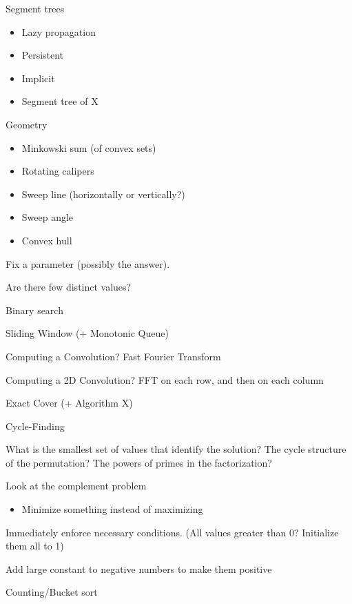 \begin{myitemize}
      \item Segment trees
        \begin{itemize}
          \item Lazy propagation
          \item Persistent
          \item Implicit
          \item Segment tree of X
        \end{itemize}
      \item Geometry
        \begin{itemize}
          \item Minkowski sum (of convex sets)
          \item Rotating calipers
          \item Sweep line (horizontally or vertically?)
          \item Sweep angle
          \item Convex hull
        \end{itemize}
      \item Fix a parameter (possibly the answer).
      \item Are there few distinct values?
      \item Binary search
      \item Sliding Window (+ Monotonic Queue)
      \item Computing a Convolution? Fast Fourier Transform
      \item Computing a 2D Convolution? FFT on each row, and then on each column
      \item Exact Cover (+ Algorithm X)
      \item Cycle-Finding
      \item What is the smallest set of values that identify the solution? The cycle structure of the permutation? The powers of primes in the factorization?
      \item Look at the complement problem
        \begin{itemize}
          \item Minimize something instead of maximizing
        \end{itemize}
      \item Immediately enforce necessary conditions. (All values greater than 0? Initialize them all to 1)
      \item Add large constant to negative numbers to make them positive
      \item Counting/Bucket sort
    \end{myitemize}

